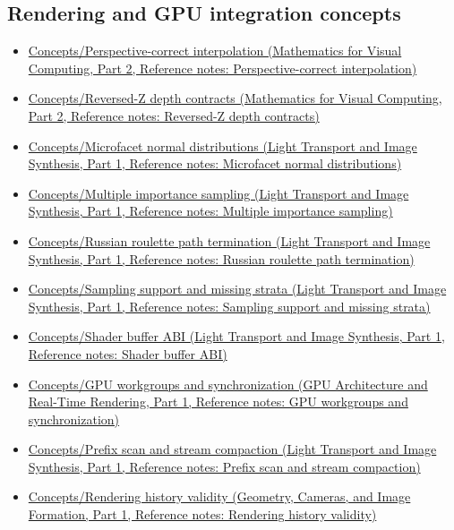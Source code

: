 \subsection{Rendering and GPU integration concepts}\label{appendix-a6d556a4ef50-rendering-and-gpu-integration-concepts}

\hypertarget{appendix-a6d556a4ef50-rendering-and-gpu-integration-concepts}{}

\begin{itemize}
\tightlist
\item
  \href{../02-Mathematics-for-Visual-Computing-P02/main.pdf\#appendix-1ed5f96c73ea}{Concepts/Perspective-correct interpolation (Mathematics for Visual Computing, Part 2, Reference notes: Perspective-correct interpolation)}
\item
  \href{../02-Mathematics-for-Visual-Computing-P02/main.pdf\#appendix-275ec8847057}{Concepts/Reversed-Z depth contracts (Mathematics for Visual Computing, Part 2, Reference notes: Reversed-Z depth contracts)}
\item
  \href{../04-Light-Transport-and-Image-Synthesis-P01/main.pdf\#appendix-885c1cb64ae9}{Concepts/Microfacet normal distributions (Light Transport and Image Synthesis, Part 1, Reference notes: Microfacet normal distributions)}
\item
  \href{../04-Light-Transport-and-Image-Synthesis-P01/main.pdf\#appendix-ca8898faf1a6}{Concepts/Multiple importance sampling (Light Transport and Image Synthesis, Part 1, Reference notes: Multiple importance sampling)}
\item
  \href{../04-Light-Transport-and-Image-Synthesis-P01/main.pdf\#appendix-7277c62d4599}{Concepts/Russian roulette path termination (Light Transport and Image Synthesis, Part 1, Reference notes: Russian roulette path termination)}
\item
  \href{../04-Light-Transport-and-Image-Synthesis-P01/main.pdf\#appendix-10308c3d753e}{Concepts/Sampling support and missing strata (Light Transport and Image Synthesis, Part 1, Reference notes: Sampling support and missing strata)}
\item
  \href{../04-Light-Transport-and-Image-Synthesis-P01/main.pdf\#appendix-749048795dbb}{Concepts/Shader buffer ABI (Light Transport and Image Synthesis, Part 1, Reference notes: Shader buffer ABI)}
\item
  \href{../06-GPU-Architecture-and-Real-Time-Rendering-P01/main.pdf\#appendix-f662b5b1773b}{Concepts/GPU workgroups and synchronization (GPU Architecture and Real-Time Rendering, Part 1, Reference notes: GPU workgroups and synchronization)}
\item
  \href{../04-Light-Transport-and-Image-Synthesis-P01/main.pdf\#appendix-f2ee4d086415}{Concepts/Prefix scan and stream compaction (Light Transport and Image Synthesis, Part 1, Reference notes: Prefix scan and stream compaction)}
\item
  \href{../03-Geometry-Cameras-and-Image-Formation-P01/main.pdf\#appendix-2e7e9fd28a2c}{Concepts/Rendering history validity (Geometry, Cameras, and Image Formation, Part 1, Reference notes: Rendering history validity)}
\end{itemize}

